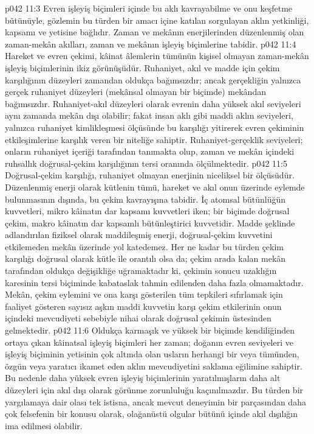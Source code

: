 \vs p042 11:3 Evren işleyiş biçimleri içinde bu aklı kavrayabilme ve onu keşfetme bütünüyle, gözlemin bu türden bir amacı içine katılan sorgulayan aklın yetkinliği, kapsamı ve yetisine bağlıdır. Zaman ve mekânın enerjilerinden düzenlenmiş olan zaman\hyp{}mekân akılları, zaman ve mekânın işleyiş biçimlerine tabidir.
\vs p042 11:4 Hareket ve evren çekimi, kâinat âlemlerin tümünün kişisel olmayan zaman\hyp{}mekân işleyiş biçimlerinin ikiz görünüşüdür. Ruhaniyet, akıl ve madde için çekim karşılığının düzeyleri zamandan oldukça bağımsızdır; ancak gerçekliğin yalnızca gerçek ruhaniyet düzeyleri (mekânsal olmayan bir biçimde) mekândan bağımsızdır. Ruhaniyet\hyp{}akıl düzeyleri olarak evrenin daha yüksek akıl seviyeleri aynı zamanda mekân dışı olabilir; fakat insan aklı gibi maddi aklın seviyeleri, yalnızca ruhaniyet kimlikleşmesi ölçüsünde bu karşılığı yitirerek evren çekiminin etkileşimlerine karşılık veren bir niteliğe sahiptir. Ruhaniyet\hyp{}gerçeklik seviyeleri; onların ruhaniyet içeriği tarafından tanımakta olup, zaman ve mekân içindeki ruhsallık doğrusal\hyp{}çekim karşılığının tersi oranında ölçülmektedir.
\vs p042 11:5 Doğrusal\hyp{}çekim karşılığı, ruhaniyet olmayan enerjinin niceliksel bir ölçüsüdür. Düzenlenmiş enerji olarak kütlenin tümü, hareket ve akıl onun üzerinde eylemde bulunmasının dışında, bu çekim kavrayışına tabidir. İç atomsal bütünlüğün kuvvetleri, mikro kâinatın dar kapsamı kuvvetleri iken; bir biçimde doğrusal çekim, makro kâinatın dar kapsamlı bütünleştirici kuvvetidir. Madde şeklinde adlandırılan fiziksel olarak maddileşmiş enerji, doğrusal\hyp{}çekim kuvvetini etkilemeden mekân üzerinde yol katedemez. Her ne kadar bu türden çekim karşılığı doğrusal olarak kütle ile orantılı olsa da; çekim arada kalan mekân tarafından oldukça değişikliğe uğramaktadır ki, çekimin sonucu uzaklığın karesinin tersi biçiminde kabataslak tahmin edilenden daha fazla olmamaktadır. Mekân, çekim eylemini ve ona karşı gösterilen tüm tepkileri sıfırlamak için faaliyet gösteren sayısız aşkın maddi kuvvetin karşı çekim etkilerinin onun içindeki mevcudiyeti sebebiyle nihai olarak doğrusal çekimin üstesinden gelmektedir.
\vs p042 11:6 Oldukça karmaşık ve yüksek bir biçimde kendiliğinden ortaya çıkan kâinatsal işleyiş biçimleri her zaman; doğanın evren seviyeleri ve işleyiş biçiminin yetisinin çok altında olan usların herhangi bir veya tümünden, özgün veya yaratıcı ikamet eden aklın mevcudiyetini saklama eğilimine sahiptir. Bu nedenle daha yüksek evren işleyiş biçimlerinin yaratılmışların daha alt düzeyleri için akıl dışı olarak görünme zorunluluğu kaçınılmazdır. Bu türden bir yargılamaya dair olası tek istisna, ancak mevcut deneyimin bir parçasından daha çok felsefenin bir konusu olarak,  olağanüstü olgular bütünü içinde akıl dışılığın ima edilmesi olabilir.
